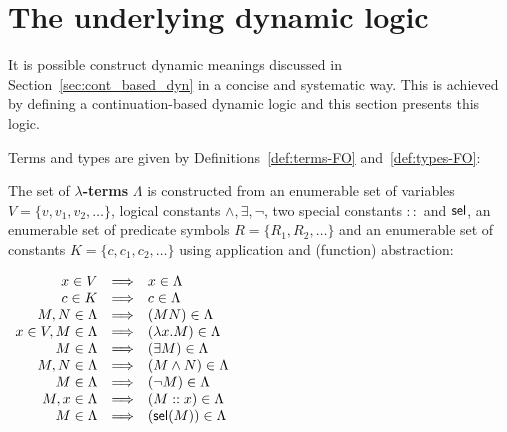 \section{The underlying dynamic logic} \label{sec:dyn_log}

It is possible construct dynamic meanings discussed in Section~\ref{sec:cont_based_dyn} in a concise and systematic way. This is achieved by defining a continuation-based dynamic logic and this section presents this logic.

Terms and types are given by Definitions~\ref{def:terms-FO} and~\ref{def:types-FO}:
\begin{definition}\label{def:FO-lambda-terms}
 The set of \textbf{$\lambda$-terms} $\Lambda$ is constructed from an enumerable set of variables $V = \{ v, v_1, v_2, \dots \}$, logical constants $\land, \exists, \neg$, two special constants $::$ and $\mathsf{sel}$, an enumerable set of predicate symbols $R = \{ R_1, R_2, \dots  \}$ and an enumerable set of constants $K = \{ c, c_1, c_2, \dots \}$  using application and (function) abstraction:
\begin{center}
$
\begin{array}{rcl}
x \in V & \Longrightarrow & x \in \Lambda\\
c \in K & \Longrightarrow & c \in \Lambda\\
M,N \in \Lambda &  \Longrightarrow & (MN) \in \Lambda\\ 
 x \in V, M \in \Lambda&  \Longrightarrow  & (\lambda x.M) \in \Lambda \\
  M \in \Lambda&  \Longrightarrow  & (\exists M) \in \Lambda\\ 
M,N \in \Lambda &  \Longrightarrow  & (M \land N) \in \Lambda \\
M \in \Lambda &  \Longrightarrow  & (\neg M)  \in \Lambda \\
M,x \in \Lambda &  \Longrightarrow  & (M::x) \in \Lambda\\
M \in \Lambda &  \Longrightarrow  & (\mathsf{sel}(M))  \in \Lambda
\end{array} 
$
\end{center}
\label{def:terms-FO}
\end{definition}



